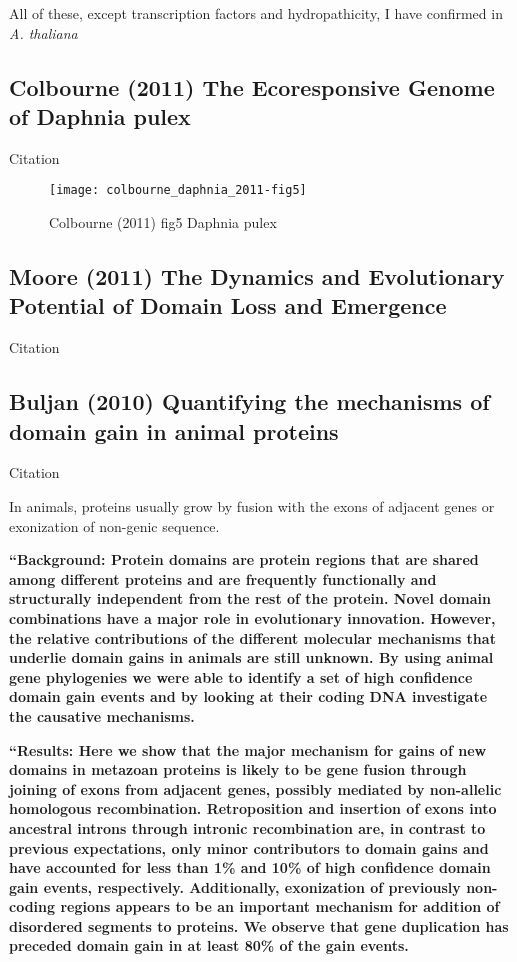     All of these, except transcription factors and hydropathicity, I have
    confirmed in \textit{A. thaliana}


\subsection{Colbourne (2011) The Ecoresponsive Genome of Daphnia pulex}

    Citation \cite{colbourne_ecoresponsive_2011}

    \begin{figure}[h!] \centering
        \texttt{[image: colbourne\_daphnia\_2011-fig5]} \caption{
            Colbourne (2011) fig5 Daphnia pulex
            \cite{colbourne_ecoresponsive_2011} } \end{figure}
        \FloatBarrier

\subsection{Moore (2011) The Dynamics and Evolutionary Potential of Domain
Loss and Emergence}

    Citation \cite{moore_dynamics_2011}


\subsection{Buljan (2010) Quantifying the mechanisms of domain gain in animal proteins}
    Citation \cite{buljan_quantifying_2010}

    In animals, proteins usually grow by fusion with the exons of adjacent
    genes or exonization of non-genic sequence.

    \textbf{``Background: Protein domains are protein regions that are shared
        among different proteins and are frequently functionally and
        structurally independent from the rest of the protein. Novel domain
        combinations have a major role in evolutionary innovation. However, the
        relative contributions of the different molecular mechanisms that
        underlie domain gains in animals are still unknown. By using animal
        gene phylogenies we were able to identify a set of high confidence
        domain gain events and by looking at their coding DNA investigate the
        causative mechanisms.}

    \textbf{``Results: Here we show that the major mechanism for gains of new
        domains in metazoan proteins is likely to be gene fusion through
        joining of exons from adjacent genes, possibly mediated by non-allelic
        homologous recombination.  Retroposition and insertion of exons into
        ancestral introns through intronic recombination are, in contrast to
        previous expectations, only minor contributors to domain gains and have
        accounted for less than 1\% and 10\% of high confidence domain gain
        events, respectively.  Additionally, exonization of previously
        non-coding regions appears to be an important mechanism for addition of
        disordered segments to proteins. We observe that gene duplication has
        preceded domain gain in at least 80\% of the gain events.}

